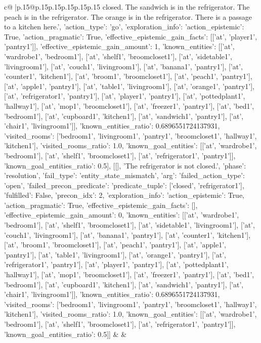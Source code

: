 \documentclass{article}
\begin{document}
{\begin{supertabular}{c@{$\;$}|p{.15\linewidth}@{}p{.15\linewidth}p{.15\linewidth}p{.15\linewidth}p{.15\linewidth}p{.15\linewidth}}
{{{closed. The sandwich is in the refrigerator. The peach is in the refrigerator. The orange is in the refrigerator. There is a passage to a kitchen here.', {'action_type': 'go', 'exploration_info': {'action_epistemic': True, 'action_pragmatic': True, 'effective_epistemic_gain_facts': [['at', 'player1', 'pantry1']], 'effective_epistemic_gain_amount': 1, 'known_entities': [['at', 'wardrobe1', 'bedroom1'], ['at', 'shelf1', 'broomcloset1'], ['at', 'sidetable1', 'livingroom1'], ['at', 'couch1', 'livingroom1'], ['at', 'banana1', 'pantry1'], ['at', 'counter1', 'kitchen1'], ['at', 'broom1', 'broomcloset1'], ['at', 'peach1', 'pantry1'], ['at', 'apple1', 'pantry1'], ['at', 'table1', 'livingroom1'], ['at', 'orange1', 'pantry1'], ['at', 'refrigerator1', 'pantry1'], ['at', 'player1', 'pantry1'], ['at', 'pottedplant1', 'hallway1'], ['at', 'mop1', 'broomcloset1'], ['at', 'freezer1', 'pantry1'], ['at', 'bed1', 'bedroom1'], ['at', 'cupboard1', 'kitchen1'], ['at', 'sandwich1', 'pantry1'], ['at', 'chair1', 'livingroom1']], 'known_entities_ratio': 0.6896551724137931, 'visited_rooms': ['bedroom1', 'livingroom1', 'pantry1', 'broomcloset1', 'hallway1', 'kitchen1'], 'visited_rooms_ratio': 1.0, 'known_goal_entities': [['at', 'wardrobe1', 'bedroom1'], ['at', 'shelf1', 'broomcloset1'], ['at', 'refrigerator1', 'pantry1']], 'known_goal_entities_ratio': 0.5}}], [[], 'The refrigerator is not closed.', {'phase': 'resolution', 'fail_type': 'entity_state_mismatch', 'arg': {'failed_action_type': 'open', 'failed_precon_predicate': {'predicate_tuple': ['closed', 'refrigerator1'], 'fulfilled': False, 'precon_idx': 2}}, 'exploration_info': {'action_epistemic': True, 'action_pragmatic': True, 'effective_epistemic_gain_facts': [], 'effective_epistemic_gain_amount': 0, 'known_entities': [['at', 'wardrobe1', 'bedroom1'], ['at', 'shelf1', 'broomcloset1'], ['at', 'sidetable1', 'livingroom1'], ['at', 'couch1', 'livingroom1'], ['at', 'banana1', 'pantry1'], ['at', 'counter1', 'kitchen1'], ['at', 'broom1', 'broomcloset1'], ['at', 'peach1', 'pantry1'], ['at', 'apple1', 'pantry1'], ['at', 'table1', 'livingroom1'], ['at', 'orange1', 'pantry1'], ['at', 'refrigerator1', 'pantry1'], ['at', 'player1', 'pantry1'], ['at', 'pottedplant1', 'hallway1'], ['at', 'mop1', 'broomcloset1'], ['at', 'freezer1', 'pantry1'], ['at', 'bed1', 'bedroom1'], ['at', 'cupboard1', 'kitchen1'], ['at', 'sandwich1', 'pantry1'], ['at', 'chair1', 'livingroom1']], 'known_entities_ratio': 0.6896551724137931, 'visited_rooms': ['bedroom1', 'livingroom1', 'pantry1', 'broomcloset1', 'hallway1', 'kitchen1'], 'visited_rooms_ratio': 1.0, 'known_goal_entities': [['at', 'wardrobe1', 'bedroom1'], ['at', 'shelf1', 'broomcloset1'], ['at', 'refrigerator1', 'pantry1']], 'known_goal_entities_ratio': 0.5}}]] 
	  } 
	   } 
	   } 
	 & & \\ 
 


\end{supertabular}}
\end{document}

